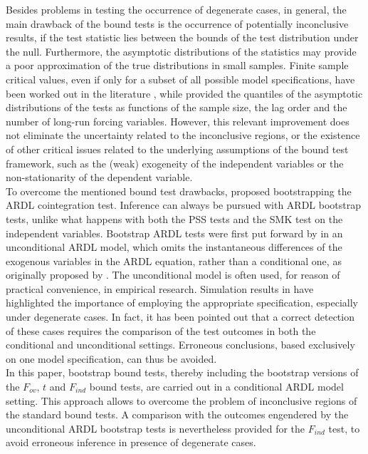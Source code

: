 Besides problems in testing the occurrence of degenerate cases, in general, the main drawback of the bound tests is the occurrence of potentially inconclusive results, if the test statistic lies between the bounds of the test distribution under the null. Furthermore, the asymptotic distributions of the statistics may provide a poor approximation of the true distributions in small samples. Finite sample critical values, even if only for a subset of all possible model specifications, have been worked out in the literature \citep[see][]{mills2001real,narayan2004crime,kanioura2005critical,narayan2005saving}, while \cite{kripfganz2020response} provided the quantiles of the asymptotic distributions of the tests as functions of the sample size, the lag order and the number of long-run forcing variables. However, this relevant improvement does not eliminate the uncertainty related to the inconclusive regions, or the existence of other critical issues related to the underlying assumptions of the bound test framework, such as the (weak) exogeneity of the independent variables or the non-stationarity of the dependent variable.\\
To overcome the mentioned bound test drawbacks, \cite{bertelli2022bootstrap} proposed bootstrapping the ARDL cointegration test. Inference can always be pursued with ARDL bootstrap tests, unlike what happens with both the PSS tests and the SMK test on the independent variables.
Bootstrap ARDL tests were first put forward by \cite{mcnown2018bootstrapping} in an unconditional ARDL model, which omits the instantaneous differences of the exogenous variables in the ARDL equation, rather than a conditional one, as originally proposed by \cite{pesaran2001}.
The unconditional model is often used, for reason of practical convenience, in empirical research. Simulation results in \cite{bertelli2022bootstrap} have highlighted the importance of employing the appropriate specification, especially under degenerate cases. In fact, it has been pointed out that a correct detection of these cases requires the comparison of the test outcomes in both the conditional and unconditional settings. Erroneous conclusions, based exclusively on one model specification, can thus be avoided.\\
In this paper, bootstrap bound tests, thereby including the bootstrap versions of the $F_{ov}$, $t$ and $F_{ind}$ bound tests, are carried out in a conditional ARDL model setting. This approach allows to overcome the problem of inconclusive regions of the standard bound tests. A comparison with the outcomes engendered by the unconditional ARDL bootstrap tests is nevertheless provided for the $F_{ind}$ test, to avoid erroneous inference in presence of degenerate cases.\\
